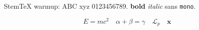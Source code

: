 


\begin{preview}

StemTeX warmup: ABC xyz 0123456789.
\textbf{bold} \textit{italic} \textsf{sans} \texttt{mono}.

\[
  E=mc^2 \quad \alpha+\beta=\gamma \quad \mathcal{L}_{p} \quad \mathbf{x}
\]

\end{preview}


